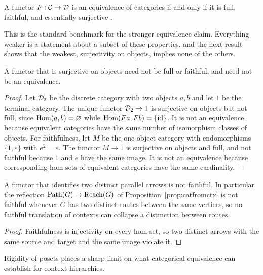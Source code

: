 \begin{theorem}\label{thm:equiv}
A functor $F:\mathcal C\to\mathcal D$ is an equivalence of categories if and only if it is full, faithful, and essentially surjective \cite{maclane}.
\end{theorem}

This is the standard benchmark for the stronger equivalence claim. Everything weaker is a statement about a subset of these properties, and the next result shows that the weakest, surjectivity on objects, implies none of the others.

\begin{proposition}\label{prop:surjnotequiv}
A functor that is surjective on objects need not be full or faithful, and need not be an equivalence.
\end{proposition}
\begin{proof}
Let $\mathcal D_2$ be the discrete category with two objects $a,b$ and let $1$ be the terminal category. The unique functor $\mathcal D_2\to1$ is surjective on objects but not full, since $\operatorname{Hom}(a,b)=\varnothing$ while $\operatorname{Hom}(F a,Fb)=\{\mathrm{id}\}$. It is not an equivalence, because equivalent categories have the same number of isomorphism classes of objects. For faithfulness, let $M$ be the one-object category with endomorphisms $\{1,e\}$ with $e^2=e$. The functor $M\to1$ is surjective on objects and full, and not faithful because $1$ and $e$ have the same image. It is not an equivalence because corresponding hom-sets of equivalent categories have the same cardinality.
\end{proof}

\begin{proposition}\label{prop:nocollapse}
A functor that identifies two distinct parallel arrows is not faithful. In particular the reflection $\operatorname{Path}(G)\to\operatorname{Reach}(G)$ of Proposition~\ref{prop:catfromctx} is not faithful whenever $G$ has two distinct routes between the same vertices, so no faithful translation of contexts can collapse a distinction between routes.
\end{proposition}
\begin{proof}
Faithfulness is injectivity on every hom-set, so two distinct arrows with the same source and target and the same image violate it.
\end{proof}

Rigidity of posets places a sharp limit on what categorical equivalence can establish for context hierarchies.

